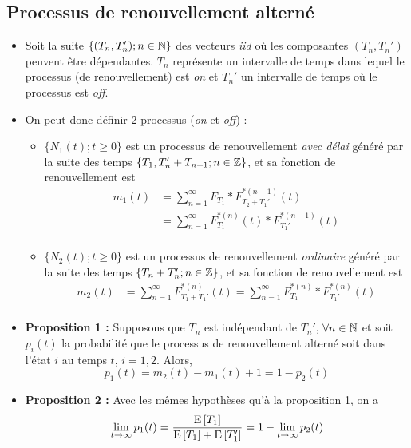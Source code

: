 \documentclass[10pt, french]{article}
\begin{document}
\begin{multicols*}{2}
\subsection*{Processus de renouvellement alterné}
\begin{itemize}
\item Soit la suite $\{ (T_n, T_n') ; n \in \mathbb{N} \}$ des vecteurs \emph{iid} où les composantes $(T_n, T_n')$ peuvent être dépendantes. $T_n$ représente un intervalle de temps dans lequel le processus (de renouvellement) est \emph{on} et $T_n'$ un intervalle de temps où le processus est \emph{off}.

\item On peut donc définir 2 processus  (\emph{on} et \emph{off}) :  
\begin{itemize}
	\item $\{ N_1(t) ; t \geq 0 \}$ est un processus de renouvellement \emph{avec délai} généré par la suite des temps $\{ T_1, T_n' + T_{n+1} ; n \in \mathbb{Z} \}$, et sa fonction de renouvellement est
	\begin{align*}
	m_1(t) & = \sum_{n=1}^{\infty} F_{T_1} \ast F_{T_2 + T_1'}
	^{\ast(n-1)}(t) \\
	& = \sum_{n=1}^{\infty} F_{T_1}^{\ast(n)}(t) \ast F_{T_1'}^{\ast(n-1)}(t) \\
	\end{align*}
	\item 	$\{ N_2(t) ; t \geq 0 \}$ est un processus de renouvellement \emph{ordinaire} généré par la suite des temps $\{ T_n + T_n'; n \in \mathbb{Z} \}$, et sa fonction de renouvellement est
	\begin{align*}
	m_2(t) &= \sum_{n=1}^{\infty} F_{T_1 +  T_1'}^{\ast(n)}(t) = \sum_{n=1}^{\infty} F_{T_1}^{\ast(n)} \ast F_{T_1'}^{\ast(n)}(t) \\
	\end{align*}
\end{itemize}
\item \textbf{Proposition 1 : } Supposons que $T_n$ est indépendant de $T_n'$, $\forall n \in \mathbb{N}$ et soit $p_i(t)$ la probabilité que le processus de renouvellement alterné soit dans l'état $i$ au temps $t$, $i=1,2$. Alors,
\[p_1(t) = m_2(t) - m_1(t) + 1 = 1 - p_2(t) \]

\item \textbf{Proposition 2 : } Avec les mêmes hypothèses qu'à la proposition 1, on a
\[\lim_{t \to \infty} p_1(t) = \frac{\mathrm{E} \left[ T_1 \right]}{\mathrm{E} \left[ T_1 \right] + \mathrm{E} \left[ T_1' \right]} = 1 - \lim_{t \to \infty} p_2(t) \]
\end{itemize}


\end{multicols*}
\end{document}
